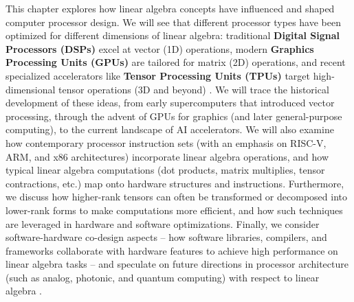 This chapter explores how linear algebra concepts have influenced and shaped computer processor design. We will see that different processor types have been optimized for different dimensions of linear algebra: traditional \textbf{Digital Signal Processors (DSPs)} excel at vector (1D) operations, modern \textbf{Graphics Processing Units (GPUs)} are tailored for matrix (2D) operations, and recent specialized accelerators like \textbf{Tensor Processing Units (TPUs)} target high-dimensional tensor operations (3D and beyond) \cite{Jouppi17}. We will trace the historical development of these ideas, from early supercomputers that introduced vector processing, through the advent of GPUs for graphics (and later general-purpose computing), to the current landscape of AI accelerators. We will also examine how contemporary processor instruction sets (with an emphasis on RISC-V, ARM, and x86 architectures) incorporate linear algebra operations, and how typical linear algebra computations (dot products, matrix multiplies, tensor contractions, etc.) map onto hardware structures and instructions. Furthermore, we discuss how higher-rank tensors can often be transformed or decomposed into lower-rank forms to make computations more efficient, and how such techniques are leveraged in hardware and software optimizations. Finally, we consider software-hardware co-design aspects – how software libraries, compilers, and frameworks collaborate with hardware features to achieve high performance on linear algebra tasks – and speculate on future directions in processor architecture (such as analog, photonic, and quantum computing) with respect to linear algebra \cite{asanovic2006landscape}.

